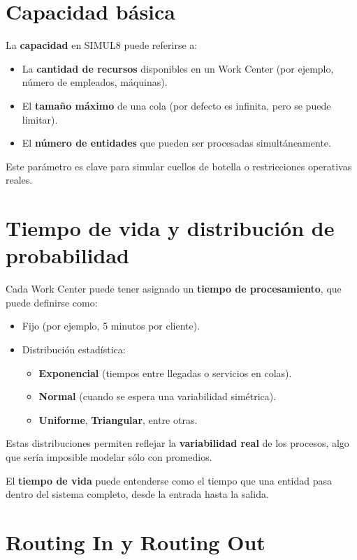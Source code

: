 \documentclass[12pt]{article}
\begin{document}
\section{Capacidad básica}

La \textbf{capacidad} en SIMUL8 puede referirse a:

\begin{itemize}
    \item La \textbf{cantidad de recursos} disponibles en un Work Center (por ejemplo, número de empleados, máquinas).
    \item El \textbf{tamaño máximo} de una cola (por defecto es infinita, pero se puede limitar).
    \item El \textbf{número de entidades} que pueden ser procesadas simultáneamente.
\end{itemize}

Este parámetro es clave para simular cuellos de botella o restricciones operativas reales.

\section{Tiempo de vida y distribución de probabilidad}

Cada Work Center puede tener asignado un \textbf{tiempo de procesamiento}, que puede definirse como:

\begin{itemize}
    \item Fijo (por ejemplo, 5 minutos por cliente).
    \item Distribución estadística:
    \begin{itemize}
        \item \textbf{Exponencial} (tiempos entre llegadas o servicios en colas).
        \item \textbf{Normal} (cuando se espera una variabilidad simétrica).
        \item \textbf{Uniforme}, \textbf{Triangular}, entre otras.
    \end{itemize}
\end{itemize}

Estas distribuciones permiten reflejar la \textbf{variabilidad real} de los procesos, algo que sería imposible modelar sólo con promedios.

El \textbf{tiempo de vida} puede entenderse como el tiempo que una entidad pasa dentro del sistema completo, desde la entrada hasta la salida.

\section{Routing In y Routing Out}
\end{document}
